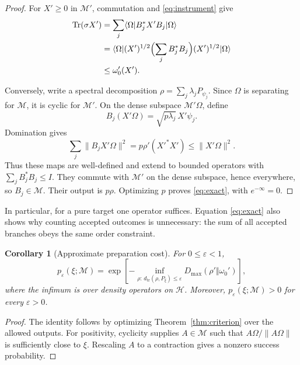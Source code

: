 \documentclass[11pt,a4paper]{article}
\newtheorem{corollary}[theorem]{Corollary}
\newcommand{\M}{\mathcal M}
\newcommand{\HH}{\mathcal H}
\newcommand{\tr}{\operatorname{Tr}}
\newcommand{\Dmax}{D_{\max}}
\newcommand{\dist}{d_{\mathrm{tr}}}
\newcommand{\ket}[1]{\lvert #1\rangle}
\newcommand{\bra}[1]{\langle #1\rvert}
\newcommand{\norm}[1]{\lVert #1\rVert}
\begin{document}
\begin{proof}
For $X'\ge0$ in $\M'$, commutation and \eqref{eq:instrument} give
\begin{align}
\tr(\sigma X')
&=\sum_j\bra\Omega B_j^*X'B_j\ket\Omega\nonumber\\
&=\bra\Omega (X')^{1/2}
\Bigl(\sum_jB_j^*B_j\Bigr)(X')^{1/2}\ket\Omega\nonumber\\
&\le\omega_0'(X').
\label{eq:necessary}
\end{align}

Conversely, write a spectral decomposition
$\rho=\sum_j\lambda_j P_{\psi_j}$. Since $\Omega$ is separating for
$\M$, it is cyclic for $\M'$. On the dense subspace $\M'\Omega$, define
\begin{equation}
B_j(X'\Omega)=\sqrt{p\lambda_j}\,X'\psi_j.
\end{equation}
Domination gives
\begin{equation}
\sum_j\norm{B_jX'\Omega}^2
=p\rho'(X'^*X')\le\norm{X'\Omega}^2.
\end{equation}
Thus these maps are well-defined and extend to bounded operators with
$\sum_jB_j^*B_j\le I$. They commute with $\M'$ on the dense subspace,
hence everywhere, so $B_j\in\M$. Their output is $p\rho$. Optimizing
$p$ proves \eqref{eq:exact}, with $e^{-\infty}=0$.
\end{proof}

In particular, for a pure target one operator suffices. Equation
\eqref{eq:exact} also shows why counting accepted outcomes is unnecessary:
the sum of all accepted branches obeys the same order constraint.

\begin{corollary}[Approximate preparation cost]
\label{cor:smooth}
For $0\le\varepsilon<1$,
\begin{equation}
p_\varepsilon(\xi;\M)
=\exp\!\left[-\inf_{\rho:\,\dist(\rho,P_\xi)\le\varepsilon}
\Dmax(\rho'\Vert\omega_0')\right],
\label{eq:smooth}
\end{equation}
where the infimum is over density operators on $\HH$. Moreover,
$p_\varepsilon(\xi;\M)>0$ for every $\varepsilon>0$.
\end{corollary}

\begin{proof}
The identity follows by optimizing Theorem~\ref{thm:criterion} over the
allowed outputs. For positivity, cyclicity supplies $A\in\M$ such that
$A\Omega/\norm{A\Omega}$ is sufficiently close to $\xi$. Rescaling
$A$ to a contraction gives a nonzero success probability.
\end{proof}
\end{document}
